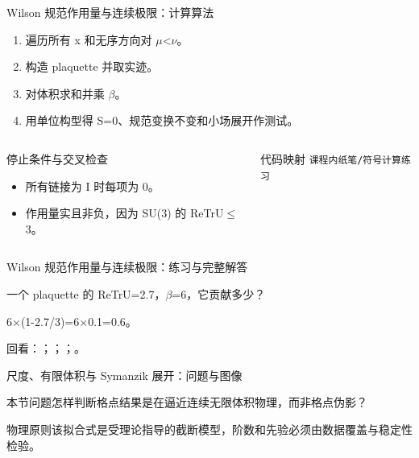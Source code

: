 \begin{frame}[t]{Wilson 规范作用量与连续极限：计算算法}
\footnotesize
{}\begin{enumerate}
\item 遍历所有 x 和无序方向对 \ensuremath{\mu}<\ensuremath{\nu}。
\item 构造 plaquette 并取实迹。
\item 对体积求和并乘 \ensuremath{\beta}。
\item 用单位构型得 S=0、规范变换不变和小场展开作测试。
\end{enumerate}\begin{columns}[T,onlytextwidth]
\begin{block}{停止条件与交叉检查}\scriptsize\begin{itemize}
\item[\CheckMark] 所有链接为 I 时每项为 0。
\item[\CheckMark] 作用量实且非负，因为 SU(3) 的 ReTrU\ensuremath{\le}3。
\end{itemize}\end{block}
\begin{block}{代码映射}
\scriptsize \texttt{课程内纸笔/\allowbreak{}符号计算练习}
\end{block}\end{columns}\end{frame}

\begin{frame}[t]{Wilson 规范作用量与连续极限：练习与完整解答}
\footnotesize
\begin{block}{}一个 plaquette 的 ReTrU=2.7，\ensuremath{\beta}=6，它贡献多少？\end{block}
\begin{exampleblock}{}6\ensuremath{\times}(1-2.7/\allowbreak{}3)=6\ensuremath{\times}0.1=0.6。\end{exampleblock}
\vfill
\scriptsize 回看：；；；。
\end{frame}

\begin{frame}[t]{尺度、有限体积与 Symanzik 展开：问题与图像}
\footnotesize
\begin{block}{本节问题}怎样判断格点结果是在逼近连续无限体积物理，而非格点伪影？\end{block}
\begin{block}{物理原则}\quad 该拟合式是受理论指导的截断模型，阶数和先验必须由数据覆盖与稳定性检验。\end{block}
\end{frame}

